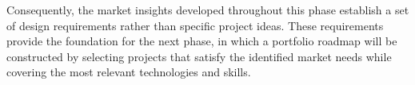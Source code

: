 Consequently, the market insights developed throughout this phase establish a set of design requirements rather than specific project ideas. These
requirements provide the foundation for the next phase, in which a portfolio roadmap will be constructed by selecting projects that satisfy the
identified market needs while covering the most relevant technologies and skills.